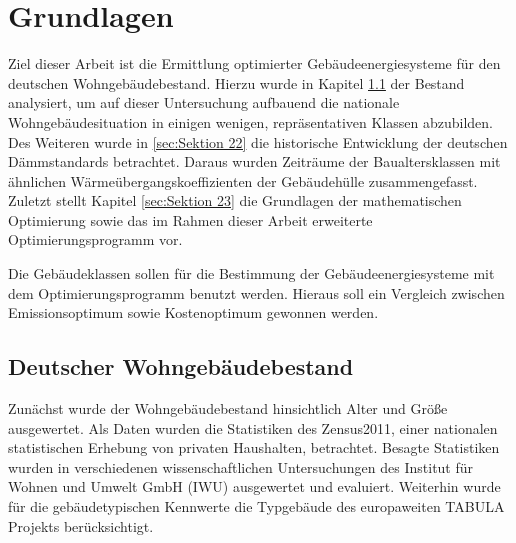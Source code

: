\chapter{Grundlagen}

Ziel dieser Arbeit ist die Ermittlung optimierter Gebäudeenergiesysteme für den deutschen Wohngebäudebestand.
Hierzu wurde in Kapitel \ref{sec:Sektion 21} der Bestand analysiert, um auf dieser Untersuchung aufbauend die nationale Wohngebäudesituation in einigen wenigen, repräsentativen Klassen abzubilden. 
Des Weiteren wurde in \ref{sec:Sektion 22} die historische Entwicklung der deutschen Dämmstandards betrachtet. Daraus wurden Zeiträume der Baualtersklassen mit ähnlichen Wärmeübergangskoeffizienten der Gebäudehülle zusammengefasst. 
Zuletzt stellt Kapitel \ref{sec:Sektion 23} die Grundlagen der mathematischen Optimierung sowie das im Rahmen dieser Arbeit erweiterte Optimierungsprogramm vor. 

Die Gebäudeklassen sollen für die Bestimmung der Gebäudeenergiesysteme mit dem Optimierungsprogramm benutzt werden. 
Hieraus soll ein Vergleich zwischen Emissionsoptimum sowie Kostenoptimum gewonnen werden.



\section{Deutscher Wohngebäudebestand}
\label{sec:Sektion 21}

Zunächst wurde der Wohngebäudebestand hinsichtlich Alter und Größe ausgewertet.
Als Daten wurden die Statistiken des Zensus2011, einer nationalen statistischen Erhebung von privaten Haushalten, betrachtet. 
Besagte Statistiken wurden in verschiedenen wissenschaftlichen Untersuchungen des Institut für Wohnen und Umwelt GmbH (IWU) ausgewertet und evaluiert.
Weiterhin wurde für die gebäudetypischen Kennwerte die Typgebäude des europaweiten TABULA Projekts berücksichtigt.

